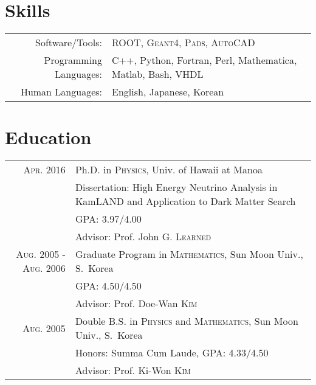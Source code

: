 \documentclass[a4paper,10pt]{article} %
\begin{document}

\section{Skills}

\begin{tabular}{rl}
	Software/Tools: & \textsc{ROOT}, \textsc{Geant4}, \textsc{Pads},
	\textsc{AutoCAD}\\
	Programming Languages: & C++, Python, Fortran, Perl, Mathematica, Matlab, Bash, VHDL\\
	Human Languages: & English, Japanese, Korean
\end{tabular}


\section{Education}

\begin{tabular}{rp{10.3cm}}	
	\textsc{Apr.} 2016 & Ph.D. in \textsc{Physics},
	Univ. of Hawaii at Manoa\\
	& \small Dissertation: High Energy Neutrino Analysis in KamLAND and
	Application to Dark Matter Search\\
	& \small GPA: 3.97/4.00\\
	& \small Advisor: Prof. John G. \textsc{Learned}\\


	\textsc{Aug.} 2005 - \textsc{Aug.} 2006 & Graduate Program in
	\textsc{Mathematics}, Sun Moon Univ., S.~Korea\\
	& \small GPA: 4.50/4.50\\
	& \small Advisor: Prof. Doe-Wan \textsc{Kim}\\


	\textsc{Aug.} 2005 & Double B.S. in \textsc{Physics} and
	\textsc{Mathematics}, Sun Moon Univ., S.~Korea\\
	& \small Honors: Summa Cum Laude, GPA: 4.33/4.50\\
	& \small Advisor: Prof. Ki-Won \textsc{Kim}\\


\end{tabular}
\end{document}
